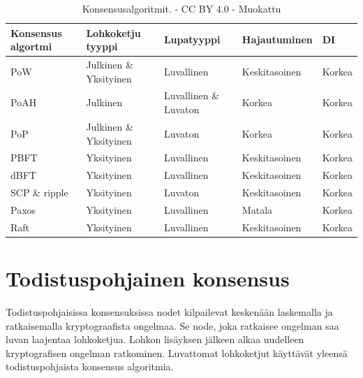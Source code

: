 \documentclass[utf8,bachelor]{gradu3}
\begin{document}
\begin{table}[ht]\centering
  \begin{tabular}{lllll}
    \toprule
    Konsensus algortmi & Lohkoketju tyyppi & Lupatyyppi & Hajautuminen & DI \\
    \midrule
    PoW     & Julkinen \& Yksityinen 
            & Luvallinen 
            & Keskitasoinen 
            & Korkea \\
            
    PoAH    & Julkinen 
            & Luvallinen \& Luvaton 
            & Korkea 
            & Korkea \\
            
    PoP     & Julkinen \& Yksityinen 
            & Luvaton
            & Korkea 
            & Korkea \\
    \midrule
    PBFT    & Yksityinen  
            & Luvallinen
            & Keskitasoinen 
            & Korkea \\
            
    dBFT    & Yksityinen  
            & Luvallinen 
            & Keskitasoinen 
            & Korkea \\
            
    SCP \& ripple   
            & Yksityinen  
            & Luvaton
            & Keskitasoinen 
            & Korkea \\
    \midrule
    Paxos
            & Yksityinen
            & Luvallinen
            & Matala
            & Korkea \\
    Raft
            & Yksityinen
            & Luvallinen
            & Keskitasoinen
            & Korkea \\

    \bottomrule
  \end{tabular}
  \caption{Konsensusalgoritmit. \cite{zarrin2021blockchain} - CC BY 4.0 - Muokattu}
  \label{tbl:konsensus}
\end{table}

\section{Todistuspohjainen konsensus}
Todistuspohjaisissa konsensuksissa nodet kilpailevat keskenään laskemalla ja ratkaisemalla kryptograafista ongelmaa.
Se node, joka ratkaisee ongelman saa luvan laajentaa lohkoketjua.
Lohkon lisäyksen jälkeen alkaa uudelleen kryptografisen ongelman ratkominen.
Luvattomat lohkoketjut käyttävät yleensä todistuspohjaista konsensus algoritmia.
\end{document}
